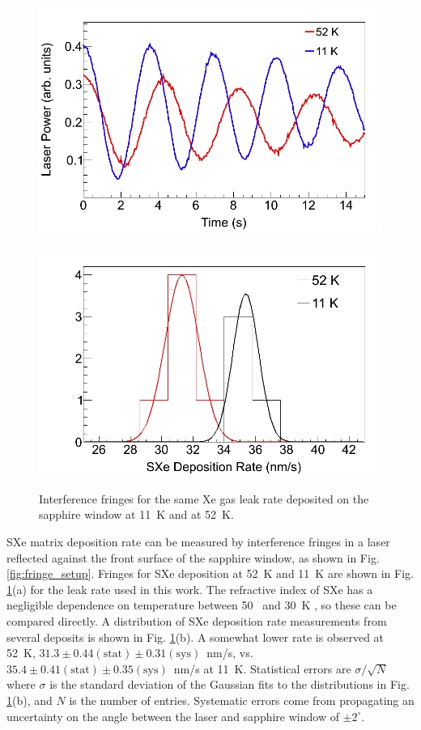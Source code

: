 \begin{figure} %
        \centering
                \includegraphics[width=.5\textwidth]{figures/fringes_52K_vs_11K.png}
                ~
                \includegraphics[width=.5\textwidth]{figures/fringes_52K_vs_11K_statistics.png}
                \caption{Interference fringes for the same Xe gas leak rate deposited on the sapphire window at 11~K and at 52~K.}
\label{fig:fringes_52K_vs_11K}
\end{figure}

SXe matrix deposition rate can be measured by interference fringes in a laser reflected against the front surface of the sapphire window, as shown in Fig. \ref{fig:fringe_setup}.  Fringes for SXe deposition at 52~K and 11~K are shown in Fig. \ref{fig:fringes_52K_vs_11K}(a) for the leak rate used in this work.  The refractive index of SXe has a negligible dependence on temperature between 50~ and 30~K \cite{SXeIndex}, so these can be compared directly.  A distribution of SXe deposition rate measurements from several deposits is shown in Fig. \ref{fig:fringes_52K_vs_11K}(b).  A somewhat lower rate is observed at 52~K, $31.3 \pm 0.44(\text{stat}) \pm 0.31(\text{sys})$~nm/s, vs. $35.4 \pm 0.41(\text{stat}) \pm 0.35(\text{sys})$~nm/s at 11~K.  Statistical errors are $\sigma / \sqrt{N}$ where $\sigma$ is the standard deviation of the Gaussian fits to the distributions in Fig. \ref{fig:fringes_52K_vs_11K}(b), and $N$ is the number of entries.  Systematic errors come from propagating an uncertainty on the angle between the laser and sapphire window of $\pm 2^{\circ}$.

